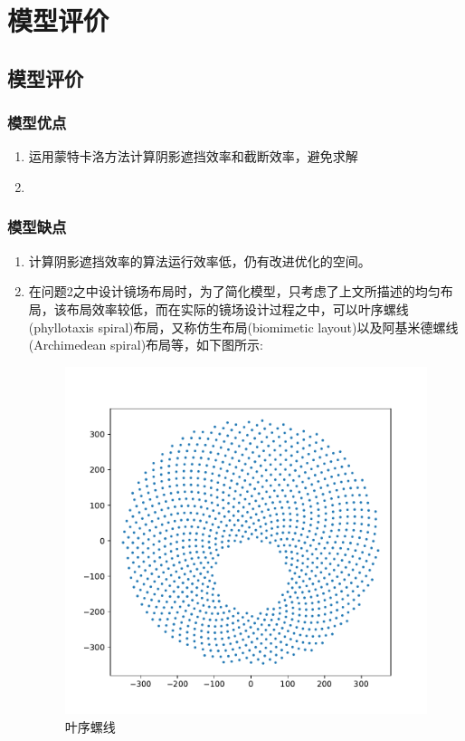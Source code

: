 \section{模型评价}
\subsection{模型评价}
\subsubsection{模型优点}
\begin{enumerate}
\item 运用蒙特卡洛方法计算阴影遮挡效率和截断效率，避免求解
\item 
\end{enumerate}

\subsubsection{模型缺点}
\begin{enumerate}
\item 计算阴影遮挡效率的算法运行效率低，仍有改进优化的空间。
\item 在问题2之中设计镜场布局时，为了简化模型，只考虑了上文所描述的均匀布局，该布局效率较低，而在实际的镜场设计过程之中，可以叶序螺线(phyllotaxis spiral)布局，又称仿生布局(biomimetic layout)以及阿基米德螺线(Archimedean spiral)布局等\cite{noone}，如下图所示:
\begin{figure}[H]
\centering
\includegraphics[scale = 0.5]{yexu.pdf}
\caption{\kaishu 叶序螺线}
\end{figure}
\end{enumerate}

